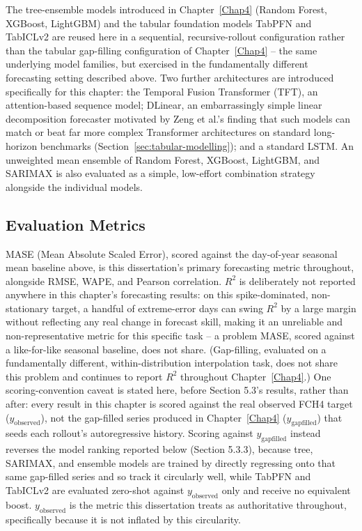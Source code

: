 The tree-ensemble models introduced in Chapter~\ref{Chap4} (Random Forest, XGBoost, LightGBM) and
the tabular foundation models TabPFN and TabICLv2 are reused here in a sequential, recursive-rollout
configuration rather than the tabular gap-filling configuration of Chapter~\ref{Chap4} -- the same
underlying model families, but exercised in the fundamentally different forecasting setting
described above. Two further architectures are introduced specifically for this chapter: the
Temporal Fusion Transformer (TFT), an attention-based sequence model; DLinear, an embarrassingly
simple linear decomposition forecaster motivated by Zeng et al.'s finding that such models can match
or beat far more complex Transformer architectures on standard long-horizon benchmarks
(Section~\ref{sec:tabular-modelling}); and a standard LSTM. An unweighted mean ensemble of Random
Forest, XGBoost, LightGBM, and SARIMAX is also evaluated as a simple, low-effort combination
strategy alongside the individual models.

\subsection{Evaluation Metrics}

MASE (Mean Absolute Scaled Error), scored against the day-of-year seasonal mean baseline above, is
this dissertation's primary forecasting metric throughout, alongside RMSE, WAPE, and Pearson
correlation. $R^2$ is deliberately not reported anywhere in this chapter's forecasting results: on
this spike-dominated, non-stationary target, a handful of extreme-error days can swing $R^2$ by a
large margin without reflecting any real change in forecast skill, making it an unreliable and
non-representative metric for this specific task -- a problem MASE, scored against a like-for-like
seasonal baseline, does not share. (Gap-filling, evaluated on a fundamentally different,
within-distribution interpolation task, does not share this problem and continues to report $R^2$
throughout Chapter~\ref{Chap4}.) One
scoring-convention caveat is stated here, before Section 5.3's results, rather than after: every
result in this chapter is scored against the real observed FCH4 target ($y_{\text{observed}}$), not
the gap-filled series produced in Chapter~\ref{Chap4} ($y_{\text{gapfilled}}$) that seeds each
rollout's autoregressive history. Scoring against $y_{\text{gapfilled}}$ instead reverses the model
ranking reported below (Section 5.3.3), because tree, SARIMAX, and ensemble models are trained by
directly regressing onto that same gap-filled series and so track it circularly well, while TabPFN
and TabICLv2 are evaluated zero-shot against $y_{\text{observed}}$ only and receive no equivalent
boost. $y_{\text{observed}}$ is the metric this dissertation treats as authoritative throughout,
specifically because it is not inflated by this circularity.


